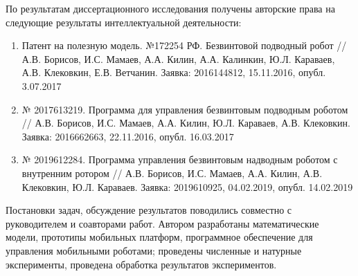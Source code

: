 По результатам диссертационного исследования получены авторские права на следующие результаты интеллектуальной деятельности:
\begin{enumerate}
	
	\item Патент на полезную модель. №172254 РФ. Безвинтовой подводный робот //  А.В. Борисов, И.С. Мамаев, А.А. Килин, А.А. Калинкин, Ю.Л. Караваев, А.В. Клековкин, Е.В. Ветчанин. Заявка: 2016144812, 15.11.2016, опубл. 3.07.2017
	
	\item № 2017613219. Программа для управления безвинтовым подводным роботом // А.В. Борисов, И.С. Мамаев, А.А. Килин, Ю.Л. Караваев, А.В. Клековкин. Заявка: 2016662663, 22.11.2016, опубл. 16.03.2017
	
	\item № 2019612284. Программа управления безвинтовым надводным роботом с внутренним ротором // А.В. Борисов, И.С. Мамаев, А.А. Килин, А.В. Клековкин, Ю.Л. Караваев. Заявка: 2019610925, 04.02.2019, опубл. 14.02.2019
	
\end{enumerate}

{\contribution} Постановки задач, обсуждение результатов поводились совместно с руководителем и соавторами работ. Автором разработаны математические модели, прототипы мобильных платформ, программное обеспечение для управления мобильными роботами; проведены численные и натурные эксперименты, проведена обработка результатов экспериментов.

